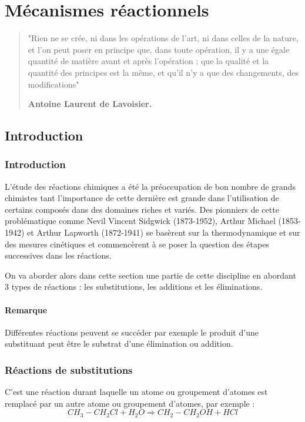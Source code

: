 \documentclass[a4paper, oneside]{book}
\begin{document}
\part{Mécanismes réactionnels}
\begin{quotation}
\vspace*{7cm}
\LARGE{"Rien ne se crée, ni dans les opérations de l’art, ni dans celles de la nature, et l’on peut poser en principe que, dans toute opération, il y a une égale quantité de matière avant et après l’opération ; que la qualité et la quantité des principes est la même, et qu’il n’y a que des changements, des modifications"\\
\begin{center}
    \textbf{Antoine Laurent de Lavoisier.}
\end{center}}
\end{quotation}
\chapter{Introduction}
\minitoc
\section{Introduction}
L'étude des réactions chimiques a été la préoccupation de bon nombre de grands chimistes tant l'importance de cette dernière est grande dans l'utilisation de certains composés dans des domaines riches et variés. Des pionniers de cette problématique comme Nevil Vincent Sidgwick (1873-1952), Arthur Michael (1853-1942) et Arthur Lapworth (1872-1941) se basèrent sur la thermodynamique et sur des mesures cinétiques et commencèrent à se poser la question des étapes successives dans les réactions. 

On va aborder alors dans cette section une partie de cette discipline en abordant 3 types de réactions : les substitutions, les additions et les éliminations. 
\subsection*{Remarque}
Différentes réactions peuvent se succéder par exemple le produit d'une substituant peut être le substrat d'une élimination ou addition.
\section{Réactions de substitutions}
C'est une réaction durant laquelle un atome ou groupement d'atomes est remplacé par un autre atome ou groupement d'atomes, par exemple :
\[
    CH_3-CH_2Cl + H_2O \Longrightarrow CH_2-CH_2OH + HCl
\]
\end{document}
